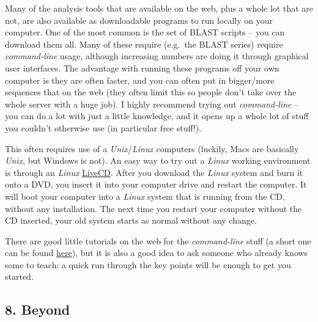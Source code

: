 \documentclass[]{article}
\begin{document}
Many of the analysis tools that are available on the web, plus a whole
lot that are not, are also available as downloadable programs to run
locally on your computer. One of the most common is the set of BLAST
scripts -- you can download them all. Many of these require (e.g.~the
BLAST series) require \emph{command-line} usage, although increasing
numbers are doing it through graphical user interfaces. The advantage
with running these programs off your own computer is they are often
faster, and you can often put in bigger/more sequences that on the web
(they often limit this so people don't take over the whole server with a
huge job). I highly recommend trying out \emph{command-line} -- you can
do a lot with just a little knowledge, and it opens up a whole lot of
stuff you couldn't otherwise use (in particular free stuff!).

This often requires use of a \emph{Unix}/\emph{Linux} computers
(luckily, Macs are basically \emph{Unix}, but Windows is not). An easy
way to try out a \emph{Linux} working environment is through an
\emph{Linux}
\href{https://help.ubuntu.com/community/LiveCD\#How-To_LiveCD_Ubuntu}{LiveCD}.
After you download the \emph{Linux} system and burn it onto a DVD, you
insert it into your computer drive and restart the computer. It will
boot your computer into a \emph{Linux} system that is running from the
CD, without any installation. The next time you restart your computer
without the CD inserted, your old system starts as normal without any
change.

There are good little tutorials on the web for the \emph{command-line}
stuff (a short one can be found
\href{http://compbio.massey.ac.nz/wiki/\#!comp_unix.md}{here}), but it
is also a good idea to ask someone who already knows some to teach: a
quick run through the key points will be enough to get you started.

\subsection{8. Beyond}\label{beyond}
\end{document}
